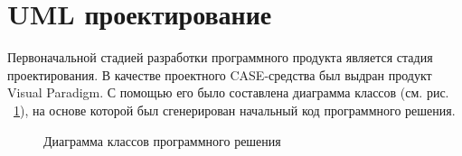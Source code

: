 \section{UML проектирование}

Первоначальной стадией разработки программного продукта является стадия проектирования.
В качестве проектного CASE-средства был выдран продукт Visual Paradigm.
С помощью его было составлена диаграмма классов (см. рис. ~\ref{ris:UML}), на основе которой был сгенерирован начальный код программного решения.

\begin{figure}[h]
\caption{Диаграмма классов программного решения}
\label{ris:UML}
\end{figure}